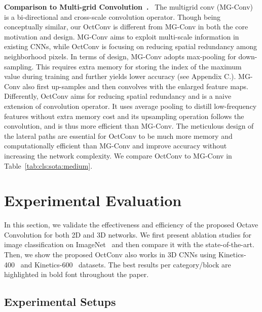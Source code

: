 \documentclass[10pt,twocolumn,letterpaper]{article}
\newcommand{\hiConv}[0]{OctConv\xspace}
\newcommand{\hiConvName}[0]{Octave Convolution\xspace}
\newcommand{\myparagraph}[1]{\vspace{1pt}\noindent\textbf{#1.}~}
\begin{document}
\label{sec:imp:mg-conv}
\myparagraph{Comparison to Multi-grid Convolution~\cite{ke2017multigrid}}
The multigrid conv (MG-Conv)~\cite{ke2017multigrid} is a bi-directional and cross-scale convolution operator. Though being conceptually similar, our \hiConv is different from MG-Conv in both the core motivation and design. MG-Conv aims to exploit multi-scale information in existing CNNs, while \hiConv is focusing on reducing spatial redundancy among neighborhood pixels. In terms of design, MG-Conv adopts max-pooling for down-sampling. This requires extra memory for storing the index of the maximum value during training and further yields lower accuracy (see Appendix C.). MG-Conv also first up-samples and then convolves with the enlarged feature maps. Differently, \hiConv aims for reducing spatial redundancy and is a naive extension of convolution operator. It uses average pooling to distill low-frequency features without extra memory cost and its upsampling operation follows the convolution, and is thus more efficient than MG-Conv. 
The meticulous design of the lateral paths are essential for \hiConv to be much more memory and computationally efficient than MG-Conv and improve accuracy without increasing the network complexity. We compare \hiConv to MG-Conv in Table~\ref{tab:cls:sota:medium}.
 

\section{Experimental Evaluation}
\label{sec:experiments}

In this section, we validate the effectiveness and efficiency of the proposed \hiConvName for both 2D and 3D networks. We first present ablation studies for image classification on ImageNet~\cite{imagenet} and then compare it with the state-of-the-art. Then, we show the proposed \hiConv also works in 3D CNNs using Kinetics-400~\cite{kay2017kinetics, k400} and Kinetics-600~\cite{k600} datasets. The best results per category/block are highlighted in bold font throughout the paper.

\subsection{Experimental Setups}
\end{document}
